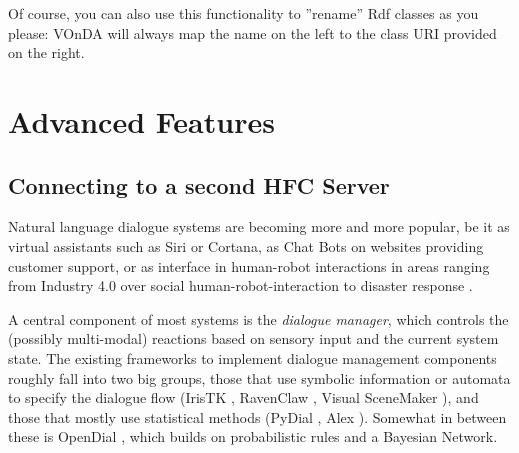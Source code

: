 \documentclass[a4paper]{report}
\newcommand{\vonda}{VOnDA\xspace}
\begin{document}
Of course, you can also use this functionality to ''rename'' Rdf classes as you please: \vonda will always map the name on the left to the class URI provided on the right.

\section{Advanced Features}

\subsection{Connecting to a second HFC Server}









%
Natural language dialogue systems are becoming more and more popular, be it as
virtual assistants such as Siri or Cortana, as Chat Bots on websites providing
customer support, or as interface in human-robot interactions in areas ranging
from Industry 4.0 \citep{schwartz2016hybrid} over social human-robot-interaction
\citep{alize2010} to disaster response \citep{kruijff2015tradr}.

A central component of most systems is the \emph{dialogue manager}, which
controls the (possibly multi-modal) reactions based on sensory input and the
current system state. The existing frameworks to implement dialogue management
components roughly fall into two big groups, those that use symbolic
information or automata to specify the dialogue flow (IrisTK
\citep{2012iristk}, RavenClaw \citep{bohus2009ravenclaw}, Visual SceneMaker
\citep{gebhard2012visual}), and those that mostly use statistical methods
(PyDial \cite{ultes2017pydial}, Alex \citep{jurvcivcek2014alex}). Somewhat in
between these is OpenDial \citep{lison2015developing}, which builds on
probabilistic rules and a Bayesian Network.
\end{document}
